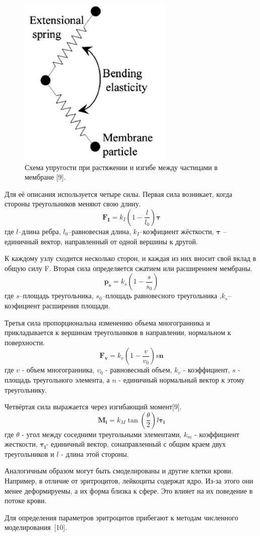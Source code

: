 \begin{figure}[h]
\centering
\includegraphics[width=0.3\linewidth]{mol3.png}
\caption{ Схема упругости при растяжении и изгибе между частицами в мембране [9].}
\label{fig:mpr}
\end{figure}

Для её описания используется четыре силы.
Первая сила возникает, когда стороны треугольников меняют свою длину.
$$
\mathbf {F_I}=k_I\left(1- \frac{l}{l_0}\right) \mathbf {\tau}
$$
где $l$--длина ребра, $l_0$--равновесная длина, $k_I$--коэфициент жёсткости, $\mathbf { \tau}$ --единичный вектор, направленный от одной вершины к другой.

К каждому узлу сходится несколько сторон, и каждая из них вносит свой вклад в общую силу F. Вторая сила определяется сжатием или расширением мембраны.  
$$\mathbf {p_s}=k_s(1- \frac{s}{s_0})$$
где $s$--площадь треугольника, $s_0$--площадь равновесного треугольника ,$k_s$--коэфициент расширения площади.

Третья сила пропорциональна изменению объема многогранника и прикладывается к вершинам треугольников в направлении, нормальном к поверхности. 
$$\mathbf {F_v}=k_v(1- \frac{v}{v_0}) s \mathbf{n}$$
где $v$ - объем многогранника, $v_0$ - равновесный объем, $k_v$ - коэффициент, $s$ - площадь
треугольного элемента, а $n$ - единичный нормальный вектор к этому треугольнику.

Четвёртая сила выражается через изгибающий момент[9].
$$\mathbf {M_i}=k_M \tan(\frac{\theta}{2})l \mathbf{\tau_i}$$
где $\theta$ - угол между соседними треугольными элементами, $k_m$ - коэффициент жесткости, $\mathbf{\tau_i}$- единичный вектор, сонаправленный с общим краем двух треугольников и $l$ - длина этой стороны.

Аналогичным образом могут быть смоделированы и другие клетки крови. Например, в отличие от эритроцитов, лейкоциты содержат ядро. Из-за этого они менее деформируемы, а их форма близка к сфере. Это влияет на их поведение в потоке крови.

Для определения параметров эритроцитов прибегают к методам численного моделирования~[10].


